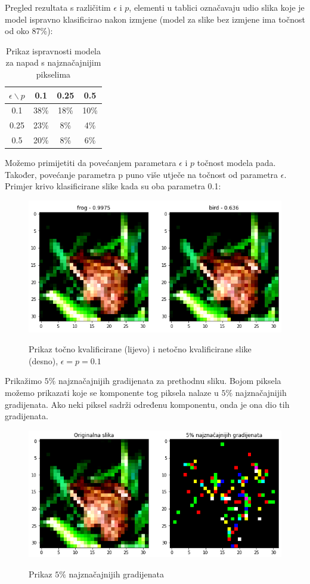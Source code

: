 Pregled rezultata s različitim $\epsilon$ i $p$, elementi u tablici označavaju udio slika koje je model ispravno klasificirao nakon izmjene (model za slike bez izmjene ima točnost od oko 87\%):

\begin{table}[H]
	\centering
	\begin{tabular}{||c || c c c||} 
		\hline
		$\epsilon \backslash p$ & 0.1 & 0.25 & 0.5 \\ [0.5ex] 
		\hline\hline
		0.1 & 38\% & 18\% & 10\% \\ 
		0.25 & 23\% & 8\% & 4\% \\
		0.5 & 20\% & 8\% & 6\% \\ [1ex] 
		\hline
	\end{tabular}
	\caption{Prikaz ispravnosti modela za napad s najznačajnijim pikselima}
\end{table}

Možemo primijetiti da povećanjem parametara $\epsilon$ i $p$ točnost modela pada. Također, povećanje parametra p puno više utječe na točnost od parametra $\epsilon$. Primjer krivo klasificirane slike kada su oba parametra 0.1:
\begin{figure}[H]
	\centering
	{{\includegraphics[width=11.5cm]{slike/napadi/selected-grads-example.png} }}%
	\caption{Prikaz točno kvalificirane (lijevo) i netočno kvalificirane slike (desno), $\epsilon = p = 0.1$}%
	\label{fig:pixel_fgsm}%
\end{figure}

Prikažimo $5\%$ najznačajnijih gradijenata za prethodnu sliku. Bojom piksela možemo prikazati koje se komponente tog piksela nalaze u $5\%$ najznačajnijih gradijenata. Ako neki piksel sadrži određenu komponentu, onda je ona dio tih gradijenata.
\begin{figure}[H]
	\centering
	{{\includegraphics[width=11.5cm]{slike/napadi/selected-grads-visualisation.png} }}%
	\caption{Prikaz $5\%$ najznačajnijih gradijenata}%
	\label{fig:najznacajniji}%
\end{figure}

